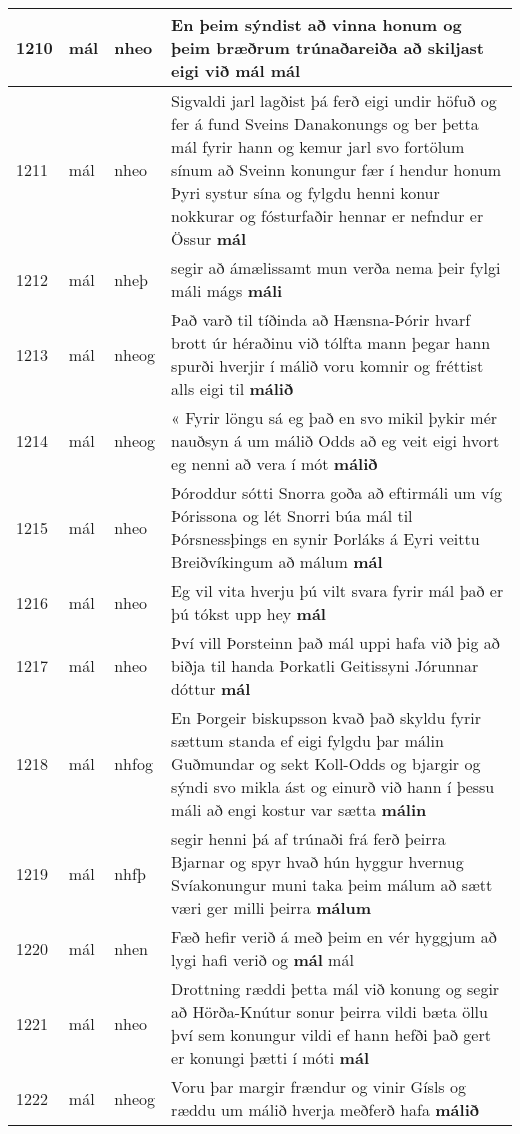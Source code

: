 \documentclass{article}
\begin{document}
\begin{longtable}{p{1cm}|p{1cm}|p{1cm}|p{13cm}}
\hline
1210&mál&nheo&En þeim sýndist að vinna honum og þeim bræðrum trúnaðareiða að skiljast eigi við \textbf{mál} mál\\
\hline
1211&mál&nheo&Sigvaldi jarl lagðist þá ferð eigi undir höfuð og fer á fund Sveins Danakonungs og ber þetta mál fyrir hann og kemur jarl svo fortölum sínum að Sveinn konungur fær í hendur honum Þyri systur sína og fylgdu henni konur nokkurar og fósturfaðir hennar er nefndur er Össur \textbf{mál} \\
\hline
1212&mál&nheþ&segir að ámælissamt mun verða nema þeir fylgi máli mágs \textbf{máli} \\
\hline
1213&mál&nheog&Það varð til tíðinda að Hænsna-Þórir hvarf brott úr héraðinu við tólfta mann þegar hann spurði hverjir í málið voru komnir og fréttist alls eigi til \textbf{málið} \\
\hline
1214&mál&nheog&« Fyrir löngu sá eg það en svo mikil þykir mér nauðsyn á um málið Odds að eg veit eigi hvort eg nenni að vera í mót \textbf{málið} \\
\hline
1215&mál&nheo&Þóroddur sótti Snorra goða að eftirmáli um víg Þórissona og lét Snorri búa mál til Þórsnessþings en synir Þorláks á Eyri veittu Breiðvíkingum að málum \textbf{mál} \\
\hline
1216&mál&nheo&Eg vil vita hverju þú vilt svara fyrir mál það er þú tókst upp hey \textbf{mál} \\
\hline
1217&mál&nheo&Því vill Þorsteinn það mál uppi hafa við þig að biðja til handa Þorkatli Geitissyni Jórunnar dóttur \textbf{mál} \\
\hline
1218&mál&nhfog&En Þorgeir biskupsson kvað það skyldu fyrir sættum standa ef eigi fylgdu þar málin Guðmundar og sekt Koll-Odds og bjargir og sýndi svo mikla ást og einurð við hann í þessu máli að engi kostur var sætta \textbf{málin} \\
\hline
1219&mál&nhfþ&segir henni þá af trúnaði frá ferð þeirra Bjarnar og spyr hvað hún hyggur hvernug Svíakonungur muni taka þeim málum að sætt væri ger milli þeirra \textbf{málum} \\
\hline
1220&mál&nhen&Fæð hefir verið á með þeim en vér hyggjum að lygi hafi verið og \textbf{mál} mál\\
\hline
1221&mál&nheo&Drottning ræddi þetta mál við konung og segir að Hörða-Knútur sonur þeirra vildi bæta öllu því sem konungur vildi ef hann hefði það gert er konungi þætti í móti \textbf{mál} \\
\hline
1222&mál&nheog&Voru þar margir frændur og vinir Gísls og ræddu um málið hverja meðferð hafa \textbf{málið} \\

\end{longtable}
\end{document}
